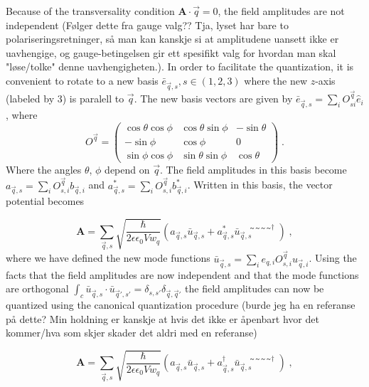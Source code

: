 \documentclass{article}
\begin{document}
Because of the transversality condition $\textbf{A} \cdot \vec{q} = 0$, the field amplitudes are not independent (Følger dette fra gauge valg?? Tja, lyset har bare to polariseringsretninger, så man kan kanskje si at amplitudene uansett ikke er uavhengige, og gauge-betingelsen gir ett spesifikt valg for hvordan man skal "løse/tolke" denne uavhengigheten.). In order to facilitate the quantization, it is convenient to rotate to a new basis $\bar{e}_{\vec{q}, s}, s \in (1,2,3)$ where the new $z$-axis (labeled by $3$) is paralell to $\vec{q}$. The new basis vectors are given by $\bar{e}_{\vec{q}, s} = \sum_i O^{\vec{q}}_{si} \hat{e}_i $, where
\begin{equation}
    O^{\vec{q}} = \begin{pmatrix} 
    \cos{\theta}\cos{\phi} & \cos{\theta}\sin{\phi} & - \sin{\theta} \\ 
    -\sin{\phi}            & \cos{\phi}             & 0 \\
    \sin{\phi}\cos{\phi}   & \sin{\theta}\sin{\phi} & \cos{\theta}
    \end{pmatrix}\;.
\end{equation}
Where the angles $\theta$, $\phi$ depend on $\vec{q}$. The field amplitudes in this basis become $a_{\vec{q},s} = \sum_i O^{\vec{q}}_{s,i} b_{\vec{q}, i}$ and $a_{\vec{q},s}^{*} = \sum_i O^{\vec{q}}_{s,i} b_{\vec{q}, i}^{*}$. Written in this basis, the vector potential becomes

\begin{equation}
\textbf{A} = \sum_{\vec{q}, s} \sqrt{\frac{\hbar}{2 \epsilon \epsilon_0 V w_q}} \left(a_{\vec{q},s} \bar{u}_{\vec{q},s} + a_{\vec{q},s}^{*} \bar{u}_{\vec{q},s}̃̃̃̃^{\dagger}\right)\;,
\end{equation}
where we have defined the new mode functions $\bar{u}_{\vec{q},s} = \sum_i e_{q,i} O^{\vec{q}}_{s,i} u_{\vec{q}, i}$. Using the facts that the field amplitudes are now independent and that the mode functions are orthogonal $\int_c \bar{u}_{\vec{q},s} \cdot \bar{u}_{\vec{q}',s'} = \delta_{s,s'}\delta_{\vec{q},\vec{q}'} $ the field amplitudes can now be quantized using the canonical quantization procedure (burde jeg ha en referanse på dette? Min holdning er kanskje at hvis det ikke er åpenbart hvor det kommer/hva som skjer skader det aldri med en referanse)

\begin{equation}
\textbf{A} = \sum_{\vec{q}, s} \sqrt{\frac{\hbar}{2 \epsilon \epsilon_0 V w_q}} \left(a_{\vec{q},s} \bar{u}_{\vec{q},s} + a_{\vec{q},s}^{\dagger} \bar{u}_{\vec{q},s}̃̃̃̃^{\dagger}\right)\;, 
\end{equation}
\end{document}
